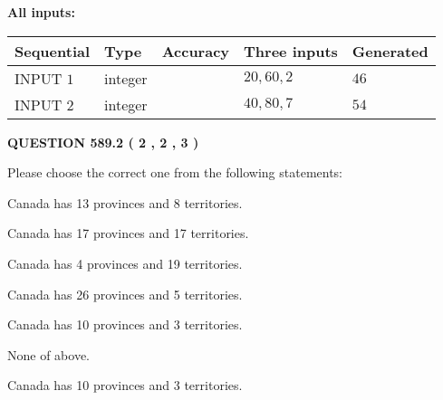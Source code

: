 \documentclass[12pt]{article}
\begin{document}
   
   
   
\noindent{}
   
   
   
   
\noindent\vspace{0.1in}\hspace{-0.08in} {\textbf{\Large{All inputs: }}}
   
   
  
  
\noindent\begin{tabular}{|l|l|l|l|l|}
\hline
 Sequential & Type & Accuracy & Three inputs & Generated \\ 
\hline
 
 
  INPUT $  1 $ & integer &  & $
 20
 , 
 60
 , 
 2
 $ & $ 46 $ 
 \\  \hline  
 
 
  INPUT $  2 $ & integer &  & $
 40
 , 
 80
 , 
 7
 $ & $ 54 $ 
 \\  \hline  
 \end{tabular}
   
   
  
\vspace{0.2in}
  
{\textbf{\Large{QUESTION
589.2 
 ( 2 , 2 , 3 )
}}}
  
  
Please choose the correct one from the following statements:
 
 
Canada has  13 provinces and  8 territories.
 
 
Canada has  17 provinces and  17 territories.
 
 
Canada has   4 provinces and  19 territories.
 
 
Canada has  26 provinces and  5 territories.
 
 
Canada has 10  provinces and 3 territories.
 
 
 None of above.
 
 
\noindent{}
 
 
Canada has 10  provinces and 3 territories.
 
 
\noindent{}
 
 
   
\end{document}
